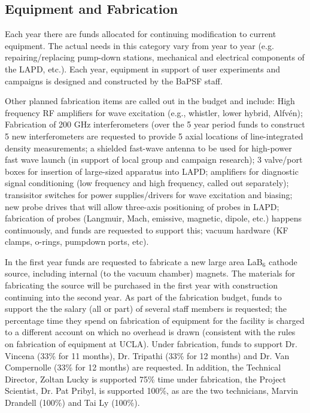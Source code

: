 \documentclass[11pt]{article}
\begin{document}
\subsection*{Equipment and Fabrication}

Each year there are funds allocated for continuing modification to
current equipment. The actual needs in this category vary from year to
year (e.g. repairing/replacing pump-down stations, mechanical and
electrical components of the LAPD, etc.).  Each year, equipment in
support of user experiments and campaigns is designed and constructed
by the BaPSF staff. 

Other planned fabrication items are called out in
the budget and include: High frequency RF amplifiers for wave
excitation (e.g., whistler, lower hybrid, Alfv\'{e}n); Fabrication of
200 GHz interferometers (over the 5 year period funds to construct 5
new interferometers are requested to provide 5 axial locations of
line-integrated density measurements; a shielded fast-wave antenna to
be used for high-power fast wave launch (in support of local group and
campaign research); 3 valve/port boxes for insertion of large-sized
apparatus into LAPD; amplifiers for diagnostic signal conditioning
(low frequency and high frequency, called out separately); transisitor
switches for power supplies/drivers for wave excitation and biasing;
new probe drives that will allow three-axis positioning of probes in
LAPD; fabrication of probes (Langmuir, Mach, emissive, magnetic,
dipole, etc.) happens continuously, and funds are requested to support
this; vacuum hardware (KF clamps, o-rings, pumpdown ports, etc).  

In the first year funds are
requested to fabricate a new large area LaB$_6$ cathode source,
including internal (to the vacuum chamber) magnets.  The materials for
fabricating the source will be purchased in the first year with
construction continuing into the second year.  As part of the
fabrication budget, funds to support the the salary (all or part) of
several staff members is requested; the percentage time they spend on
fabrication of equipment for the facility is charged to a different
account on which no overhead is drawn (consistent with the rules on
fabrication of equipment at UCLA).  Under fabrication, funds to
support Dr. Vincena (33\% for 11 months), Dr. Tripathi (33\% for 12
months) and Dr. Van Compernolle (33\% for 12 months) are requested.
In addition, the Technical Director, Zoltan Lucky is supported 75\%
time under fabrication, the Project Scientist, Dr. Pat Pribyl, is
supported 100\%, as are the two technicians, Marvin Drandell (100\%)
and Tai Ly (100\%). 
\end{document}
